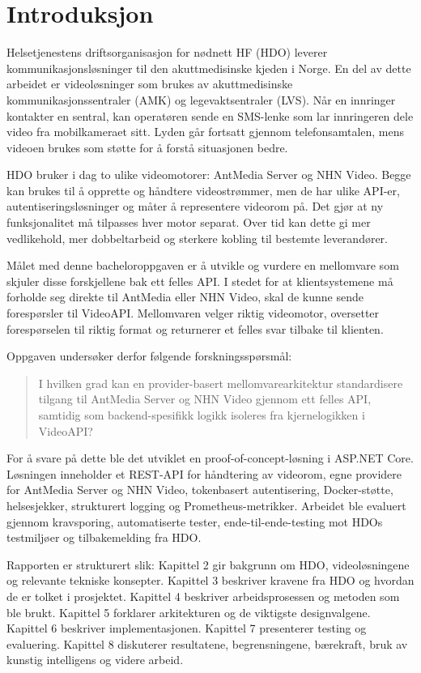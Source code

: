 \chapter{Introduksjon}

Helsetjenestens driftsorganisasjon for nødnett HF (HDO) leverer kommunikasjonsløsninger til den akuttmedisinske kjeden i Norge. En del av dette arbeidet er videoløsninger som brukes av akuttmedisinske kommunikasjonssentraler (AMK) og legevaktsentraler (LVS). Når en innringer kontakter en sentral, kan operatøren sende en SMS-lenke som lar innringeren dele video fra mobilkameraet sitt. Lyden går fortsatt gjennom telefonsamtalen, mens videoen brukes som støtte for å forstå situasjonen bedre.

HDO bruker i dag to ulike videomotorer: AntMedia Server og NHN Video. Begge kan brukes til å opprette og håndtere videostrømmer, men de har ulike API-er, autentiseringsløsninger og måter å representere videorom på. Det gjør at ny funksjonalitet må tilpasses hver motor separat. Over tid kan dette gi mer vedlikehold, mer dobbeltarbeid og sterkere kobling til bestemte leverandører.

Målet med denne bacheloroppgaven er å utvikle og vurdere en mellomvare som skjuler disse forskjellene bak ett felles API. I stedet for at klientsystemene må forholde seg direkte til AntMedia eller NHN Video, skal de kunne sende forespørsler til VideoAPI. Mellomvaren velger riktig videomotor, oversetter forespørselen til riktig format og returnerer et felles svar tilbake til klienten.

Oppgaven undersøker derfor følgende forskningsspørsmål:

\begin{quote}
I hvilken grad kan en provider-basert mellomvarearkitektur standardisere tilgang til AntMedia Server og NHN Video gjennom ett felles API, samtidig som backend-spesifikk logikk isoleres fra kjernelogikken i VideoAPI?
\end{quote}

For å svare på dette ble det utviklet en proof-of-concept-løsning i ASP.NET Core. Løsningen inneholder et REST-API for håndtering av videorom, egne providere for AntMedia Server og NHN Video, tokenbasert autentisering, Docker-støtte, helsesjekker, strukturert logging og Prometheus-metrikker. Arbeidet ble evaluert gjennom kravsporing, automatiserte tester, ende-til-ende-testing mot HDOs testmiljøer og tilbakemelding fra HDO.

Rapporten er strukturert slik: Kapittel 2 gir bakgrunn om HDO, videoløsningene og relevante tekniske konsepter. Kapittel 3 beskriver kravene fra HDO og hvordan de er tolket i prosjektet. Kapittel 4 beskriver arbeidsprosessen og metoden som ble brukt. Kapittel 5 forklarer arkitekturen og de viktigste designvalgene. Kapittel 6 beskriver implementasjonen. Kapittel 7 presenterer testing og evaluering. Kapittel 8 diskuterer resultatene, begrensningene, bærekraft, bruk av kunstig intelligens og videre arbeid.